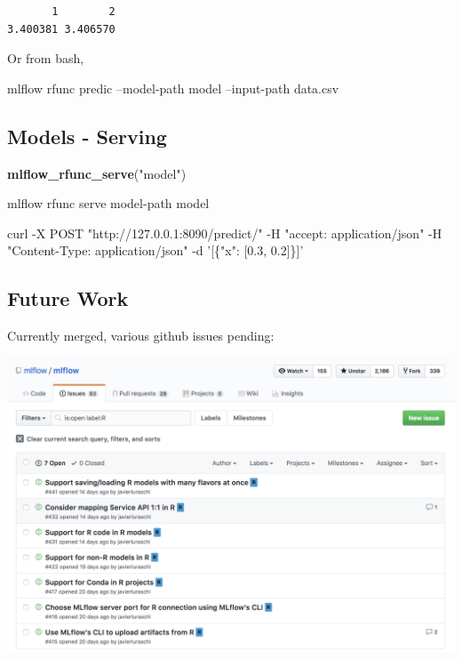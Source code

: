 \documentclass[]{article}
\newenvironment{Shaded}{\begin{snugshade}}{\end{snugshade}}
\newcommand{\ExtensionTok}[1]{#1}
\newcommand{\KeywordTok}[1]{\textcolor[rgb]{0.13,0.29,0.53}{\textbf{#1}}}
\newcommand{\NormalTok}[1]{#1}
\newcommand{\StringTok}[1]{\textcolor[rgb]{0.31,0.60,0.02}{#1}}
\begin{document}
\begin{verbatim}
       1        2 
3.400381 3.406570
\end{verbatim}

Or from bash,

\begin{Shaded}
\begin{Highlighting}[]
\ExtensionTok{mlflow}\NormalTok{ rfunc predic --model-path model --input-path data.csv}
\end{Highlighting}
\end{Shaded}

\hypertarget{models---serving}{%
\subsection{Models - Serving}\label{models---serving}}

\begin{Shaded}
\begin{Highlighting}[]
\KeywordTok{mlflow_rfunc_serve}\NormalTok{(}\StringTok{"model"}\NormalTok{)}
\end{Highlighting}
\end{Shaded}

\begin{Shaded}
\begin{Highlighting}[]
\ExtensionTok{mlflow}\NormalTok{ rfunc serve model-path model}
\end{Highlighting}
\end{Shaded}

\begin{Shaded}
\begin{Highlighting}[]
\ExtensionTok{curl}\NormalTok{ -X POST }\StringTok{"http://127.0.0.1:8090/predict/"}\NormalTok{ -H }\StringTok{"accept: application/json"}\NormalTok{ -H }\StringTok{"Content-Type: application/json"}\NormalTok{ -d }\StringTok{'[\{"x": [0.3, 0.2]\}]'}
\end{Highlighting}
\end{Shaded}

\hypertarget{future-work}{%
\subsection{Future Work}\label{future-work}}

Currently merged, various github issues pending:

\includegraphics{images/mlflow-github-r-issues.png}
\end{document}
